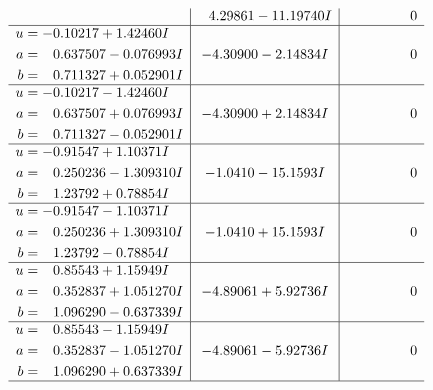 \documentclass[1p]{elsarticle_modified}
\theoremstyle{definition}
\begin{document}
$$\begin{array}{c|c|c}
 & \phantom{-}4.29861 - 11.19740 I & \phantom{-0.000000 } 0 \\ \hline\begin{aligned}
u &= -0.10217 + 1.42460 I \\
a &= \phantom{-}0.637507 - 0.076993 I \\
b &= \phantom{-}0.711327 + 0.052901 I\end{aligned}
 & -4.30900 - 2.14834 I & \phantom{-0.000000 } 0 \\ \hline\begin{aligned}
u &= -0.10217 - 1.42460 I \\
a &= \phantom{-}0.637507 + 0.076993 I \\
b &= \phantom{-}0.711327 - 0.052901 I\end{aligned}
 & -4.30900 + 2.14834 I & \phantom{-0.000000 } 0 \\ \hline\begin{aligned}
u &= -0.91547 + 1.10371 I \\
a &= \phantom{-}0.250236 - 1.309310 I \\
b &= \phantom{-}1.23792 + 0.78854 I\end{aligned}
 & -1.0410 - 15.1593 I & \phantom{-0.000000 } 0 \\ \hline\begin{aligned}
u &= -0.91547 - 1.10371 I \\
a &= \phantom{-}0.250236 + 1.309310 I \\
b &= \phantom{-}1.23792 - 0.78854 I\end{aligned}
 & -1.0410 + 15.1593 I & \phantom{-0.000000 } 0 \\ \hline\begin{aligned}
u &= \phantom{-}0.85543 + 1.15949 I \\
a &= \phantom{-}0.352837 + 1.051270 I \\
b &= \phantom{-}1.096290 - 0.637339 I\end{aligned}
 & -4.89061 + 5.92736 I & \phantom{-0.000000 } 0 \\ \hline\begin{aligned}
u &= \phantom{-}0.85543 - 1.15949 I \\
a &= \phantom{-}0.352837 - 1.051270 I \\
b &= \phantom{-}1.096290 + 0.637339 I\end{aligned}
 & -4.89061 - 5.92736 I & \phantom{-0.000000 } 0\\
 \hline 
 \end{array}$$\newpage$$\begin{array}{c|c|c}  

\end{array}$$
\end{document}

